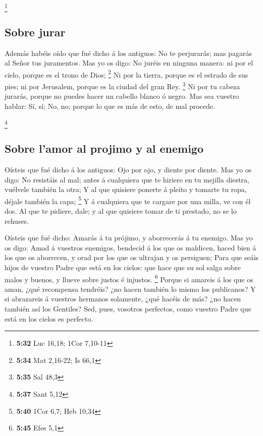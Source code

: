 \footnote{\textbf{5:32} Luc 16,18; 1Cor 7,10-11}

\hypertarget{sobre-jurar}{%
\subsection{Sobre jurar}\label{sobre-jurar}}

 Además habéis oído que fué dicho á los antiguos: No te
perjurarás; mas pagarás al Señor tus juramentos.  Mas yo os
digo: No juréis en ninguna manera: ni por el cielo, porque es el trono
de Dios; \footnote{\textbf{5:34} Mat 2,16-22; Is 66,1}  Ni
por la tierra, porque es el estrado de sus pies; ni por Jerusalem,
porque es la ciudad del gran Rey. \footnote{\textbf{5:35} Sal 48,3}
 Ni por tu cabeza jurarás, porque no puedes hacer un
cabello blanco ó negro.  Mas sea vuestro hablar: Sí, sí;
No, no; porque lo que es más de esto, de mal procede.

\footnote{\textbf{5:37} Sant 5,12}

\hypertarget{sobre-lamor-al-projimo-y-al-enemigo}{%
\subsection{Sobre l'amor al projimo y al
enemigo}\label{sobre-lamor-al-projimo-y-al-enemigo}}

 Oísteis que fué dicho á los antiguos: Ojo por ojo, y
diente por diente.  Mas yo os digo: No resistáis al mal;
antes á cualquiera que te hiriere en tu mejilla diestra, vuélvele
también la otra;  Y al que quisiere ponerte á pleito y
tomarte tu ropa, déjale también la capa; \footnote{\textbf{5:40} 1Cor
  6,7; Heb 10,34}  Y á cualquiera que te cargare por una
milla, ve con él dos.  Al que te pidiere, dale; y al que
quisiere tomar de ti prestado, no se lo rehuses.

 Oísteis que fué dicho: Amarás á tu prójimo, y aborrecerás
á tu enemigo.  Mas yo os digo: Amad á vuestros enemigos,
bendecid á los que os maldicen, haced bien á los que os aborrecen, y
orad por los que os ultrajan y os persiguen;  Para que
seáis hijos de vuestro Padre que está en los cielos: que hace que su sol
salga sobre malos y buenos, y llueve sobre justos é injustos.
\footnote{\textbf{5:45} Efes 5,1}  Porque si amareis á los
que os aman, ¿qué recompensa tendréis? ¿no hacen también lo mismo los
publicanos?  Y si abrazareis á vuestros hermanos solamente,
¿qué hacéis de más? ¿no hacen también así los Gentiles? 
Sed, pues, vosotros perfectos, como vuestro Padre que está en los cielos
es perfecto.

